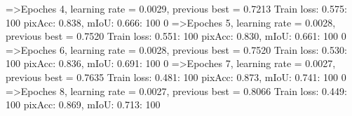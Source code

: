 =>Epoches 4, learning rate = 0.0029,                 previous best = 0.7213
Train loss: 0.575: 100%
pixAcc: 0.838, mIoU: 0.666: 100%
  0%
=>Epoches 5, learning rate = 0.0028,                 previous best = 0.7520
Train loss: 0.551: 100%
pixAcc: 0.830, mIoU: 0.661: 100%
  0%
=>Epoches 6, learning rate = 0.0028,                 previous best = 0.7520
Train loss: 0.530: 100%
pixAcc: 0.836, mIoU: 0.691: 100%
  0%
=>Epoches 7, learning rate = 0.0027,                 previous best = 0.7635
Train loss: 0.481: 100%
pixAcc: 0.873, mIoU: 0.741: 100%
  0%
=>Epoches 8, learning rate = 0.0027,                 previous best = 0.8066
Train loss: 0.449: 100%
pixAcc: 0.869, mIoU: 0.713: 100%
